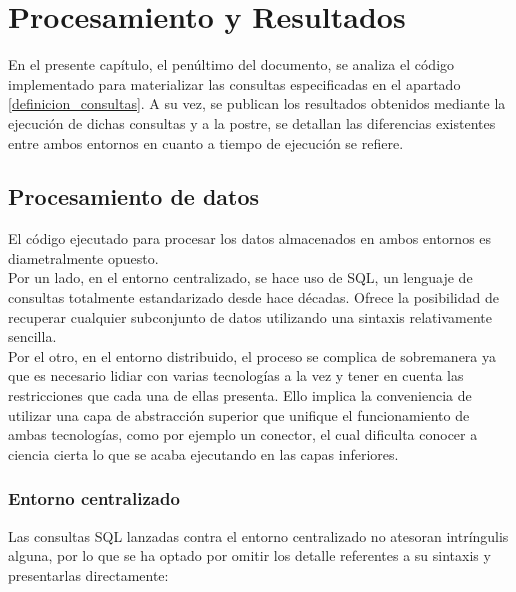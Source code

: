 
\pagestyle{fancy}

\chapter{Procesamiento y Resultados}
\label{procesamiento_datos}

En el presente capítulo, el penúltimo del documento, se analiza el código implementado para materializar las consultas especificadas en el apartado \ref*{definicion_consultas}. A su vez, se publican los resultados obtenidos mediante la ejecución de dichas consultas y a la postre, se detallan las diferencias existentes entre ambos entornos en cuanto a tiempo de ejecución se refiere.

\section{Procesamiento de datos}

El código ejecutado para procesar los datos almacenados en ambos entornos es diametralmente opuesto.\\

Por un lado, en el entorno centralizado, se hace uso de SQL, un lenguaje de consultas totalmente estandarizado desde hace décadas. Ofrece la posibilidad de recuperar cualquier subconjunto de datos utilizando una sintaxis relativamente sencilla.\\

Por el otro, en el entorno distribuido, el proceso se complica de sobremanera ya que es necesario lidiar con varias tecnologías a la vez y tener en cuenta las restricciones que cada una de ellas presenta. Ello implica la conveniencia de utilizar una capa de abstracción superior que unifique el funcionamiento de ambas tecnologías, como por ejemplo un conector, el cual dificulta conocer a ciencia cierta lo que se acaba ejecutando en las capas inferiores.\\

\subsection{Entorno centralizado}

Las consultas SQL lanzadas contra el entorno centralizado no atesoran intríngulis alguna, por lo que se ha optado por omitir los detalle referentes a su sintaxis y presentarlas directamente:\\
 
